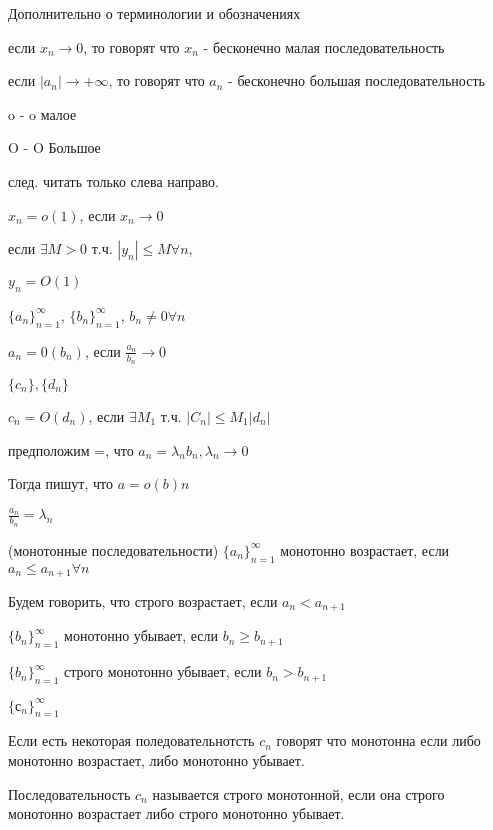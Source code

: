 Дополнительно о терминологии и обозначениях

если $x_n \to 0$, то говорят что $x_n$ - бесконечно малая последовательность

если $|a_n| \to + \infty$, то говорят что $a_n$ - бесконечно большая последовательность



\begin{notation}

o - o малое

O - O Большое

\end{notation}

след. читать только слева направо.

\begin{notation}
    $x_n = o(1)$, если $x_n \to 0$

    если $\exists M > 0$ т.ч. $|y_n| \leq M \forall n$,

    $y_n = O(1)$


\end{notation}

$\{a_n\}_{n=1}^\infty $, $\{b_n\}_{n=1}^\infty $, $b_n \neq 0 \forall n$

$a_n = 0(b_n)$, если $\frac{a_n}{b_n} \to 0$

$\{c_n\}, \{d_n\}$

$c_n = O(d_n)$, если $\exists M_1$ т.ч.
$|C_n| \leq M_1 |d_n|$

предположим =, что
$a_n = \lambda_n b_n, \lambda_n \to 0$

Тогда пишут, что $a = o(b)n$

$\frac{a_n}{b_n} = \lambda_n$

\begin{definition}(монотонные последовательности)
    $\{a_n\}_{n=1}^\infty $ монотонно возрастает, если $a_n \leq a_{n+1} \forall n$

    Будем говорить, что строго возрастает, если $a_n < a_{n+1}$

    $\{b_n\}_{n=1}^\infty $ монотонно убывает, если $b_n \geq b_{n+1}$

    $\{b_n\}_{n=1}^\infty $ строго монотонно убывает, если $b_n > b_{n+1}$

    $\{с_n\}_{n=1}^\infty $

    Если есть некоторая поледовательнотсть $c_n$ говорят что монотонна если либо монотонно возрастает, либо монотонно убывает.

    Последовательность $c_n$ называется строго монотонной, если она строго монотонно возрастает либо строго монотонно убывает.

\end{definition}


